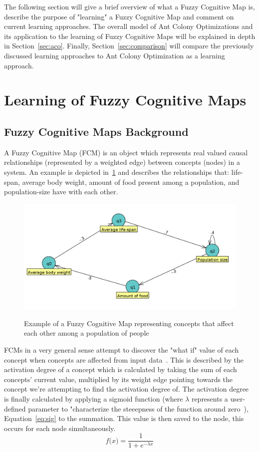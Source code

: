 \documentclass{umm-senior-sem}
\begin{document}
The following section will give a brief overview of what a Fuzzy Cognitive Map is, describe the purpose of "learning" a Fuzzy Cognitive Map and comment on current learning approaches. The overall model of Ant Colony Optimizations and its application to the learning of Fuzzy Cognitive Maps will be explained in depth in Section~\ref{sec:aco}. Finally, Section~\ref{sec:comparison} will compare the previously discussed learning approaches to Ant Colony Optimization as a learning approach.

\section{Learning of Fuzzy Cognitive Maps}
\label{fcm}
\subsection{Fuzzy Cognitive Maps Background}
A Fuzzy Cognitive Map (FCM) is an object which represents real valued causal relationships (represented by a weighted edge) between concepts (nodes) in a system. An example is depicted in~\ref{fig:fcm} and describes the relationships that: life-span, average body weight, amount of food present among a population, and population-size have with each other. 
\begin{figure}
\includegraphics[scale=0.15]{images/population.png}
\label{fig:fcm}
\caption{Example of a Fuzzy Cognitive Map representing concepts that affect each other among a population of people}
\end{figure}
FCMs in a very general sense attempt to discover the "what if" value of each concept when concepts are affected from input data~\cite{FCMbg:1999}. This is described by the activation degree of a concept which is calculated by taking the sum of each concepts' current value, multiplied by its weight edge pointing towards the concept we're attempting to find the activation degree of. The activation degree is finally calculated by applying a sigmoid function (where $\lambda$ represents a user-defined parameter to "characterize the steeepness of the function around zero~\cite{main:2012}), Equation~\ref{eq:sig} to the summation. This value is then saved to the node, this occurs for each node simultaneously.
\begin{equation}
\label{eq:sig}
 f \big(x\big) = \frac{1}{1+ e^{-\lambda x} } 
\end{equation}
\end{document}
